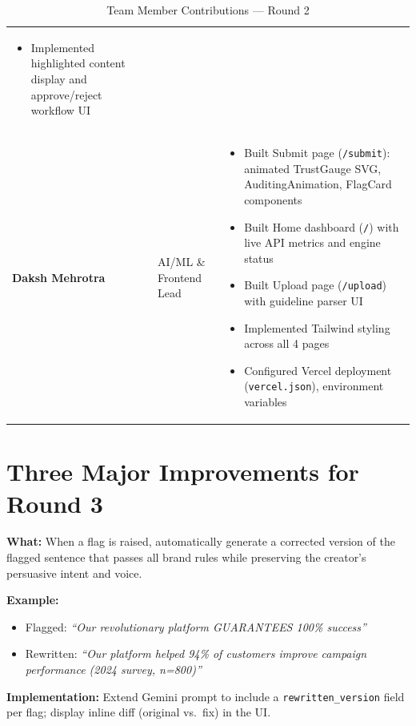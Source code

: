 \documentclass[11pt,a4paper]{article}
\begin{document}
\begin{table}[H]
\begin{tabular}{p{} p{} p{}}
\begin{itemize}[nosep,leftmargin=*]
    \item Implemented highlighted content display and approve/reject workflow UI
\end{itemize} \\
\addlinespace
\textbf{Daksh Mehrotra} & AI/ML \& Frontend Lead &
\begin{itemize}[nosep,leftmargin=*]
    \item Built Submit page (\texttt{/submit}): animated TrustGauge SVG, AuditingAnimation, FlagCard components
    \item Built Home dashboard (\texttt{/}) with live API metrics and engine status
    \item Built Upload page (\texttt{/upload}) with guideline parser UI
    \item Implemented Tailwind styling across all 4 pages
    \item Configured Vercel deployment (\texttt{vercel.json}), environment variables
\end{itemize} \\
\bottomrule
\end{tabular}
\caption{Team Member Contributions --- Round 2}
\end{table}

\section{Three Major Improvements for Round 3}

\begin{tcolorbox}[colback=primaryblue!10, colframe=primaryblue, arc=2mm, boxrule=0.5pt, title=\textbf{Improvement 1: Intent-Preserving AI Rewrites}]
\textbf{What:} When a flag is raised, automatically generate a corrected version of the flagged sentence that passes all brand rules while preserving the creator's persuasive intent and voice.

\textbf{Example:}
\begin{itemize}[nosep]
    \item Flagged: \textit{``Our revolutionary platform GUARANTEES 100\% success''}
    \item Rewritten: \textit{``Our platform helped 94\% of customers improve campaign performance (2024 survey, n=800)''}
\end{itemize}

\textbf{Implementation:} Extend Gemini prompt to include a \texttt{rewritten\_version} field per flag; display inline diff (original vs.\ fix) in the UI.
\end{tcolorbox}
\end{document}
